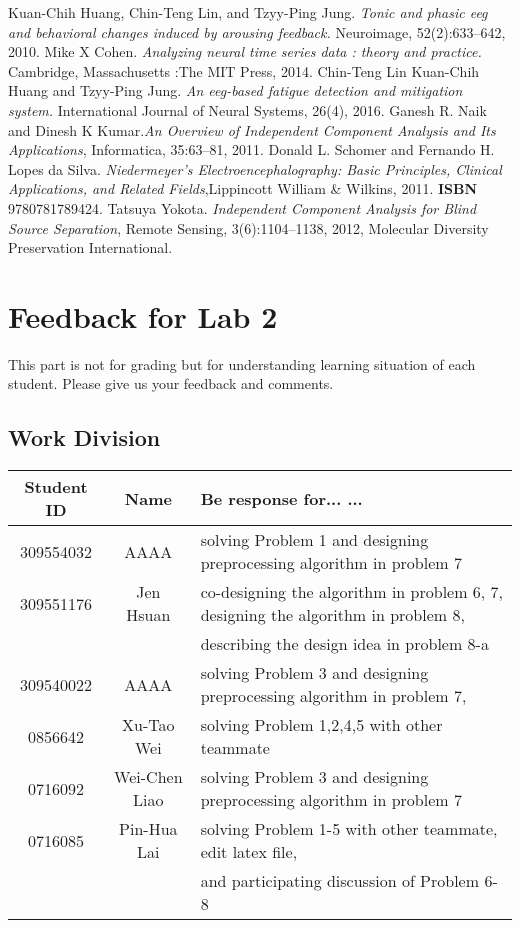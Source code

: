 \documentclass[a4 paper]{article}
\begin{document}
\begin{thebibliography}{6}
Kuan-Chih Huang, Chin-Teng Lin, and Tzyy-Ping Jung. \textit{Tonic and phasic eeg and behavioral changes induced by arousing feedback.} Neuroimage, 52(2):633–642, 2010.
Mike X Cohen. \textit{Analyzing neural time series data : theory and practice.} Cambridge, Massachusetts :The MIT Press, 2014.
\bibitem{}
Chin-Teng Lin Kuan-Chih Huang and Tzyy-Ping Jung. \textit{An eeg-based fatigue detection and mitigation system.} International Journal of Neural Systems, 26(4), 2016.
Ganesh R. Naik and Dinesh K Kumar.\textit{An Overview of Independent Component Analysis and Its Applications}, Informatica, 35:63--81, 2011.
Donald L. Schomer and Fernando H. Lopes da Silva.
\textit{Niedermeyer's Electroencephalography: Basic Principles, Clinical Applications, and Related Fields},Lippincott William \& Wilkins, 2011. \textbf{ISBN} 9780781789424.
Tatsuya Yokota. \textit{Independent Component Analysis for Blind Source Separation}, Remote Sensing, 3(6):1104--1138, 2012, Molecular Diversity Preservation International.
\end{thebibliography}
\newpage
\section{Feedback for Lab 2}
This part is not for grading but for understanding learning situation of each student. Please give us your feedback and comments.
\subsection{Work Division}
\begin{center}
    \begin{tabular}{||c|c|l||}
    \hline
    Student ID & Name & Be response for... ... \\\hline
    309554032 & AAAA & solving Problem 1 and designing preprocessing algorithm in problem 7\\\hline
    309551176 & Jen Hsuan & co-designing the algorithm in problem 6, 7, designing the algorithm in problem 8, \\\hline
     &  & \hspace*{0.5cm}describing the design idea in problem 8-a\\\hline
    309540022 & AAAA & solving Problem 3 and designing preprocessing algorithm in problem 7, \\\hline
    0856642 & Xu-Tao Wei &  solving Problem 1,2,4,5 with other teammate\\\hline
    0716092 & Wei-Chen Liao & solving Problem 3 and designing preprocessing algorithm in problem 7\\\hline
    0716085 & Pin-Hua Lai & solving Problem 1-5 with other teammate, edit latex file, \\\hline
     &  & \hspace*{0.5cm}and participating discussion of Problem 6-8\\\hline
\end{tabular}
\end{center}
\end{document}

